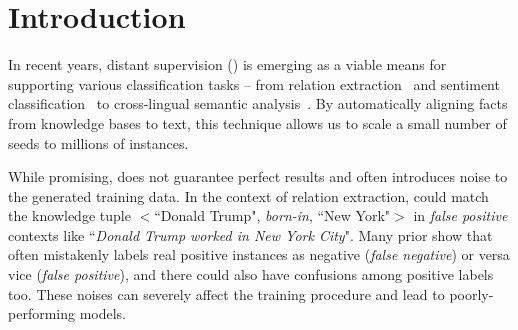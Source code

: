 \section{Introduction}

In recent years, distant supervision (\DS) is emerging as a viable means for supporting various classification tasks -- from relation extraction~\cite{mintz2009distant} and sentiment classification~\cite{go2009twitter} to cross-lingual semantic
analysis~\cite{fang2016learning}. By automatically aligning
facts from knowledge bases to text, this technique allows us to scale a small number of seeds to millions of instances.



While promising, \DS does not guarantee perfect results and often introduces noise to the
generated training data. In the context of relation extraction, \DS could match the knowledge tuple $<$``Donald Trump",
\emph{born-in}, ``New York"$>$  in \emph{false positive} contexts like ``\emph{Donald Trump worked in New York City}".
Many prior  show that \DS often mistakenly labels real positive instances as negative (\emph{false negative}) or
versa vice (\emph{false positive}), and there could also have confusions among positive labels too. These noises can
severely affect the training
procedure and lead to poorly-performing models.

